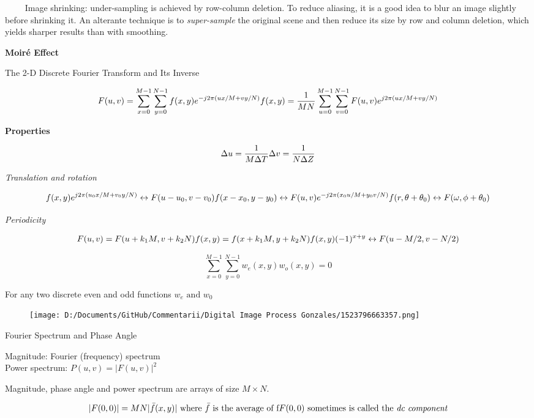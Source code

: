 \documentclass[]{article}
\begin{document}
\(\quad\quad\) Image shrinking: under-sampling is achieved by row-column
deletion. To reduce aliasing, it is a good idea to blur an image
slightly before shrinking it. An alterante technique is to
\emph{super-sample} the original scene and then reduce its size by row
and column deletion, which yields sharper results than with smoothing.

\textbf{Moiré Effect}

The 2-D Discrete Fourier Transform and Its Inverse

\[F(u,v)=\sum\limits^{M-1}_{x=0}\sum\limits^{N-1}_{y=0}f(x,y)e^{-j2\pi (ux/M+vy/N)}
\\f(x,y)=\dfrac{1}{MN}\sum\limits^{M-1}_{u=0}\sum\limits^{N-1}_{v=0}F(u,v)e^{j2\pi(ux/M+vy/N)}\]

\textbf{Properties}

\[\Delta u=\dfrac{1}{M\Delta T}\\
\Delta v = \dfrac{1}{N\Delta Z}\]

\emph{Translation and rotation}

\[f(x,y)e^{j2\pi (u_0 x/M+v_0 y/N)}\leftrightarrow F(u-u_0,v-v_0)\\
f(x-x_0,y-y_0)\leftrightarrow F(u,v)e^{-j2\pi(x_0u/M+y_0v/N)}\\
f(r,\theta + \theta_0)\leftrightarrow F(\omega,\phi + \theta_0)\]

\emph{Periodicity}

\[F(u,v)=F(u+k_1 M,v+k_2 N)\\
f(x,y)=f(x+k_1 M,y+k_2 N)\\
f(x,y)(-1)^{x+y}\leftrightarrow F(u-M/2,v-N/2)\]

\[\sum\limits^{M-1}_{x=0}\sum\limits^{N-1}_{y=0}w_e(x,y)w_o(x,y)=0\]

For any two discrete even and odd functions \(w_e\text{ and }w_0\)

\begin{figure}
\centering
\texttt{[image: D:/Documents/GitHub/Commentarii/Digital Image Process Gonzales/1523796663357.png]}
\caption{}
\end{figure}

Fourier Spectrum and Phase Angle

Magnitude: Fourier (frequency) spectrum\\
 Power spectrum: \(P(u,v)=|F(u,v)|^2\)

Magnitude, phase angle and power spectrum are arrays of size
\(M\times N\).

\[|F(0,0)|=MN|\bar{f}(x,y)|\text{    where $\bar{f}$ is the average of f}\\
\text{$F(0,0)$ sometimes is called the }\textit{dc component}\]
\end{document}
